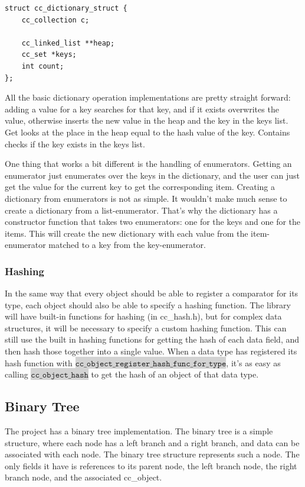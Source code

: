 \documentclass[table]{ituthesis}
\newcommand{\highlight}[1]{\colorbox{lightGray}{$\displaystyle \texttt{#1}$}}
\begin{document}
\begin{lstlisting}[label=cc_dictionary-struct,caption=Internal representation of Dictionary]
struct cc_dictionary_struct {
	cc_collection c;
	
	cc_linked_list **heap;
	cc_set *keys;
	int count;
};
\end{lstlisting}

	All the basic dictionary operation implementations are pretty straight forward: adding a value for a key searches for that key, and if it exists overwrites the value, otherwise inserts the new value in the heap and the key in the keys list. Get looks at the place in the heap equal to the hash value of the key. Contains checks if the key exists in the keys list.

	One thing that works a bit different is the handling of enumerators. Getting an enumerator just enumerates over the keys in the dictionary, and the user can just get the value for the current key to get the corresponding item. Creating a dictionary from enumerators is not as simple. It wouldn't make much sense to create a dictionary from a list-enumerator. That's why the dictionary has a constructor function that takes two enumerators: one for the keys and one for the items. This will create the new dictionary with each value from the item-enumerator matched to a key from the key-enumerator.
	
	\subsubsection{Hashing}
	
	In the same way that every object should be able to register a comparator for its type, each object should also be able to specify a hashing function. The library will have built-in functions for hashing (in cc\_hash.h), but for complex data structures, it will be necessary to specify a custom hashing function. This can still use the built in hashing functions for getting the hash of each data field, and then hash those together into a single value. When a data type has registered its hash function with \highlight{cc\_object\_register\_hash\_func\_for\_type}, it's as easy as calling \highlight{cc\_object\_hash} to get the hash of an object of that data type.
	
	\subsection{Binary Tree}
	
	The project has a binary tree implementation. The binary tree is a simple structure, where each node has a left branch and a right branch, and data can be associated with each node. The binary tree structure represents such a node. The only fields it have is references to its parent node, the left branch node, the right branch node, and the associated cc\_object.
\end{document}
